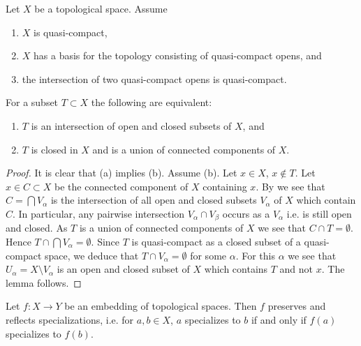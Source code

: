 \begin{lemma}
  \label{thm:intersection-closed-open-iff} %
  Let $X$ be a topological space. Assume
  \begin{enumerate}
    \item $X$ is quasi-compact,
    \item $X$ has a basis for the topology consisting of quasi-compact opens, and
    \item the intersection of two quasi-compact opens is quasi-compact.
  \end{enumerate}
  For a subset $T \subset X$ the following are equivalent:
  \begin{enumerate}
    \item $T$ is an intersection of open and closed subsets of $X$, and
    \item $T$ is closed in $X$ and is a union of connected components of $X$.
  \end{enumerate}
\end{lemma}

\begin{proof}
  It is clear that (a) implies (b). Assume (b). Let $x \in X$, $x \notin T$. Let $x \in C \subset X$ be the connected component of $X$ containing $x$. By  we see that $C = \bigcap V_\alpha$ is the intersection of all open and closed subsets $V_\alpha$ of $X$ which contain $C$. In particular, any pairwise intersection $V_\alpha \cap V_\beta$ occurs as a $V_\alpha$ i.e. is still open and closed. As $T$ is a union of connected components of $X$ we see that $C \cap T = \emptyset$. Hence $T \cap \bigcap V_\alpha = \emptyset$. Since $T$ is quasi-compact as a closed subset of a quasi-compact space, we deduce that $T \cap V_\alpha = \emptyset$ for some $\alpha$. For this $\alpha$ we see that $U_\alpha = X \setminus V_\alpha$ is an open and closed subset of $X$ which contains $T$ and not $x$. The lemma follows.
\end{proof}

\begin{lemma}
    Let $f\colon X \to Y$ be an embedding of topological spaces. Then $f$ preserves and reflects
    specializations, i.e. for $a, b \in X$, $a$ specializes to $b$ if and only if $f(a)$ specializes to $f(b)$.
    \label{lemma:embedding-specializations}
\end{lemma}

